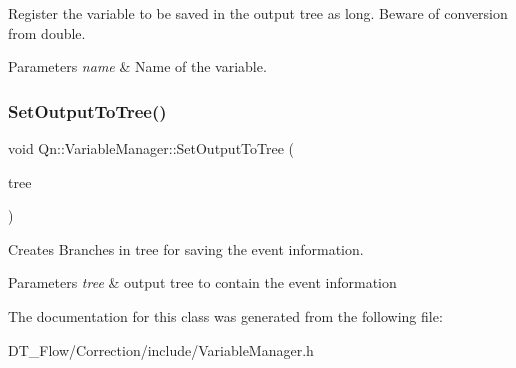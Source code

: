 Register the variable to be saved in the output tree as long. Beware of conversion from double. 


\begin{DoxyParams}{Parameters}
{\em name} & Name of the variable. \\
\hline
\end{DoxyParams}
\mbox{\label{classQn_1_1VariableManager_aff3e15625af5e34078a21ab3b6e834e7}} 
\subsubsection{\texorpdfstring{Set\+Output\+To\+Tree()}{SetOutputToTree()}}
{\footnotesize\ttfamily void Qn\+::\+Variable\+Manager\+::\+Set\+Output\+To\+Tree (\begin{DoxyParamCaption}\item[{T\+Tree $\ast$}]{tree }\end{DoxyParamCaption})\hspace{0.3cm}{\ttfamily [inline]}}



Creates Branches in tree for saving the event information. 


\begin{DoxyParams}{Parameters}
{\em tree} & output tree to contain the event information \\
\hline
\end{DoxyParams}


The documentation for this class was generated from the following file\+:\begin{DoxyCompactItemize}
\item 
D\+T\+\_\+\+Flow/\+Correction/include/Variable\+Manager.\+h\end{DoxyCompactItemize}
